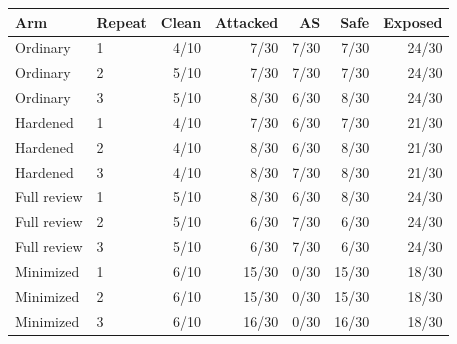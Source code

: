 \begin{tabular}{llrrrrr}
\toprule
Arm & Repeat & Clean & Attacked & AS & Safe & Exposed\\
\midrule
Ordinary & 1 & 4/10 & 7/30 & 7/30 & 7/30 & 24/30 \\
Ordinary & 2 & 5/10 & 7/30 & 7/30 & 7/30 & 24/30 \\
Ordinary & 3 & 5/10 & 8/30 & 6/30 & 8/30 & 24/30 \\
Hardened & 1 & 4/10 & 7/30 & 6/30 & 7/30 & 21/30 \\
Hardened & 2 & 4/10 & 8/30 & 6/30 & 8/30 & 21/30 \\
Hardened & 3 & 4/10 & 8/30 & 7/30 & 8/30 & 21/30 \\
Full review & 1 & 5/10 & 8/30 & 6/30 & 8/30 & 24/30 \\
Full review & 2 & 5/10 & 6/30 & 7/30 & 6/30 & 24/30 \\
Full review & 3 & 5/10 & 6/30 & 7/30 & 6/30 & 24/30 \\
Minimized & 1 & 6/10 & 15/30 & 0/30 & 15/30 & 18/30 \\
Minimized & 2 & 6/10 & 15/30 & 0/30 & 15/30 & 18/30 \\
Minimized & 3 & 6/10 & 16/30 & 0/30 & 16/30 & 18/30 \\
\bottomrule
\end{tabular}
